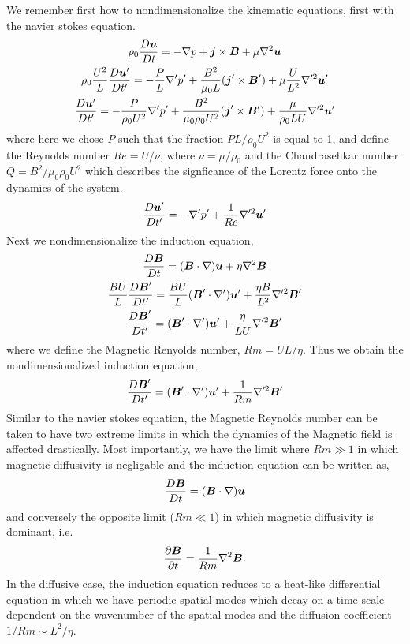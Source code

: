 \documentclass{article}
\begin{document}
We remember first how to nondimensionalize the kinematic equations, first with
the navier stokes equation. 
\begin{gather*}
    \rho_0\frac{D \boldsymbol{u}}{D t} = -\nabla p + \boldsymbol{j}\times\boldsymbol{B} +  \mu\nabla^2\boldsymbol{u}\\
    \rho_0\frac{U^2}{L}\frac{D \boldsymbol{u}'}{D t'} = -\frac{P}{L}\nabla' p' +
    \frac{B^2}{\mu_0L}(\boldsymbol{j}'\times\boldsymbol{B}') + 
    \mu\frac{U}{L^2}\nabla'^2\boldsymbol{u}'\\
    \frac{D \boldsymbol{u}'}{D t'} = -\frac{P}{\rho_0U^2}\nabla' p' +
    \frac{B^2}{\mu_0\rho_0U^2}(\boldsymbol{j}'\times\boldsymbol{B}') + 
    \frac{\mu}{\rho_0LU}\nabla'^2\boldsymbol{u}'
\end{gather*}
where here we chose $P$ such that the fraction $PL/\rho_0U^2$ is equal to 1, and
define the Reynolds number $Re = U/\nu$, where $\nu = \mu/\rho_0$ and the
Chandrasehkar number $Q = B^2/\mu_0\rho_0U^2$ which describes the signficance of
the Lorentz force onto the dynamics of the system. 
\begin{gather*}
    \frac{D \boldsymbol{u}'}{D t'} = - \nabla' p' + \frac{1}{Re}\nabla'^2\boldsymbol{u}'
\end{gather*}
Next we nondimensionalize the induction equation,
\begin{gather*}
    \frac{D \boldsymbol{B}}{D t} = (\boldsymbol{B}\cdot\nabla)\boldsymbol{u} + \eta\nabla^2\boldsymbol{B}\\
    \frac{BU}{L} \frac{D \boldsymbol{B}'}{D t'} = \frac{BU}{L}(\boldsymbol{B}'\cdot\nabla')\boldsymbol{u}' + \frac{\eta
    B}{L^2}\nabla'^2\boldsymbol{B}'\\
    \frac{D \boldsymbol{B}'}{D t'} = (\boldsymbol{B}'\cdot\nabla')\boldsymbol{u}' + \frac{\eta}{LU}\nabla'^2\boldsymbol{B}'
\end{gather*}
where we define the Magnetic Renyolds number, $Rm = UL/\eta$. Thus we obtain
the nondimensionalized induction equation, 
\begin{gather*}
    \frac{D \boldsymbol{B}'}{D t'} = (\boldsymbol{B}'\cdot\nabla')\boldsymbol{u}' + \frac{1}{Rm}\nabla'^2\boldsymbol{B}'
\end{gather*}
Similar to the navier stokes equation, the Magnetic Reynolds number can be taken
to have two extreme limits in which the dynamics of the Magnetic field is
affected drastically. Most importantly, we have the limit where $Rm \gg 1$ in
which magnetic diffusivity is negligable and the induction equation can be
written as, 
\begin{gather*}
    \frac{D \boldsymbol{B}}{D t} = (\boldsymbol{B}\cdot\nabla)\boldsymbol{u}
\end{gather*}
and conversely the opposite limit ($Rm \ll 1$) in which magnetic diffusivity is
dominant, i.e.
\begin{gather*}
    \frac{\partial \boldsymbol{B}}{\partial t} = \frac{1}{Rm}\nabla^2\boldsymbol{B}.
\end{gather*}
In the diffusive case, the induction equation reduces to a heat-like
differential equation in which we have periodic spatial modes which decay on a
time scale dependent on the wavenumber of the spatial modes and the diffusion
coefficient $1/Rm \sim L^2/\eta$. 
\end{document}

